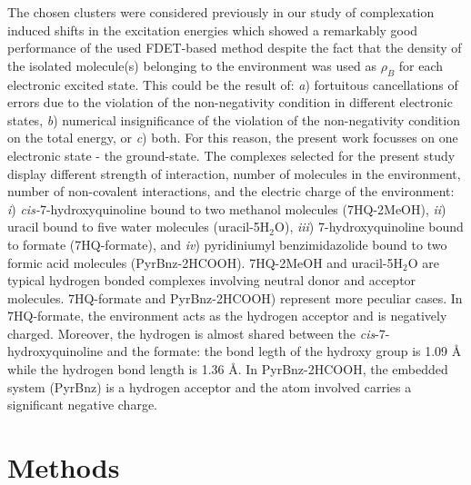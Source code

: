 \documentclass[amsmath,amssymb,preprint,aip,jcp]{revtex4-1}
\newcommand{\nr}[1]{\color{red}#1\color{black}}
\begin{document}
The chosen clusters were considered previously in our study of complexation induced shifts in the excitation energies \cite{Ricardi2018} which showed a remarkably good performance of the used FDET\nr{-}based method despite the fact that the density of the isolated molecule(s) belonging to the environment was used as $\rho_B$  for each electronic excited state. This could be the result of: {\it a})  fortuitous cancellations of errors due to the violation of the non-negativity condition in different electronic states, {\it b}) numerical insignificance of the violation of the non-negativity condition on the total energy, or {\it c}) both. 
For this reason, the present work focusses on one electronic state - the ground-state.
The complexes selected for the present study  display different strength of interaction, number of molecules in the environment, number of non-covalent interactions, and the electric charge of the environment:
{\it i})  \nr{\textit{cis-}}7-hydroxyquinoline bound to two methanol molecules (7HQ-2MeOH), {\it ii}) uracil bound to five water molecules (uracil-5H$_2$O), {\it iii}) 7-hydroxyquinoline bound to formate (7HQ-formate), and {\it iv}) \nr{pyridiniumyl } benzimidazolide bound to two formic acid molecules (PyrBnz-2HCOOH). 
7HQ-2MeOH and  uracil-5H$_2$O are typical hydrogen bonded complexes involving neutral donor and acceptor molecules. 7HQ-formate and PyrBnz-2HCOOH) represent more peculiar cases. In 7HQ-formate, the environment acts as the hydrogen acceptor and is negatively charged. Moreover, \nr{the hydrogen is almost shared between the \textit{cis}-7-hydroxyquinoline and the formate: the bond legth of the hydroxy group is 1.09 {\AA} while the hydrogen bond length is 1.36 {\AA}. }
In PyrBnz-2HCOOH, the embedded system (PyrBnz) is a hydrogen acceptor and the atom involved carries a significant negative charge.



\section{Methods}
\end{document}
